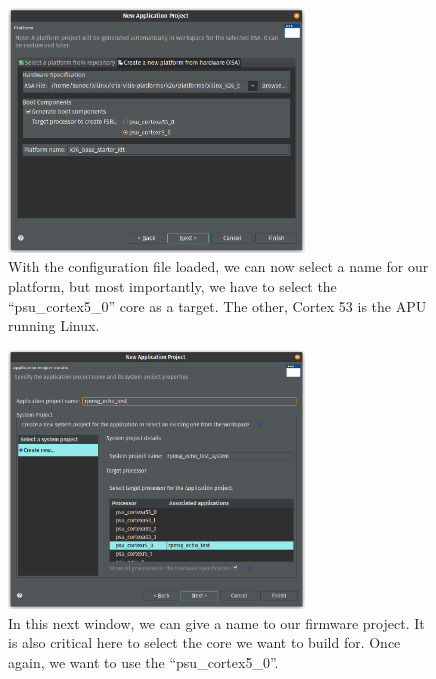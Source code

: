 \documentclass[10pt]{article}
\begin{document}
\begin{figure}[H]
  \centering
  \includegraphics[width=0.7\textwidth]{./img/vitis_new/project4}
  \caption{With the configuration file loaded, we can now select a name for our platform, but most importantly, we have to select the ``psu\_cortex5\_0'' core
    as a target. The other, Cortex 53 is the APU running Linux.}
  \label{fig:project4}
\end{figure}

\begin{figure}[H]
  \centering
  \includegraphics[width=0.7\textwidth]{./img/vitis_new/project5}
  \caption{In this next window, we can give a name to our firmware project. It is also critical here to select the core we want to build for.
    Once again, we want to use the ``psu\_cortex5\_0''.}
  \label{fig:project5}
\end{figure}
\end{document}
